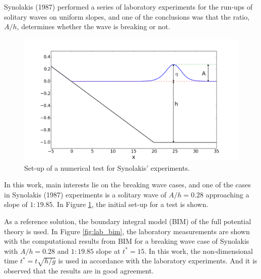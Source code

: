 \documentclass[review]{elsarticle}
\begin{document}


Synolakis (1987) \cite{synolakis1987runup} performed 
a series of laboratory experiments for the run-ups of solitary waves
on uniform slopes,
and one of the conclusions was that
the ratio, $A/h$, determines
whether the wave is breaking or not. 

\begin{figure}[!htb]
\centering
\includegraphics[width=.7\textwidth]{_fig/initial_setup.png}
\caption{Set-up of a numerical test for Synolakis' experiments.}
\label{fig:init_setup}
\end{figure}

In this work, main interests lie 
on the breaking wave cases, and 
one of the cases in Synolakis (1987) experiments is  
a solitary wave of $A/h=0.28$ approaching a slope of $1:19.85$.
In Figure \ref{fig:init_setup}, 
the initial set-up for a test is shown. 

As a reference solution, 
the boundary integral model (BIM) of the full potential theory is used.
In Figure \ref{fig:lab_bim}, the laboratory measurements
are shown with the computational results from BIM
for a breaking wave case of Synolakis with $A/h=0.28$ and $1:19.85$ slope
at $t^*=15$. In this work, the non-dimensional time 
$t^*=t\sqrt{h/g}$ is used 
in accordance with the laboratory experiments.
And it is observed that the results are in good agreement. 
\end{document}
